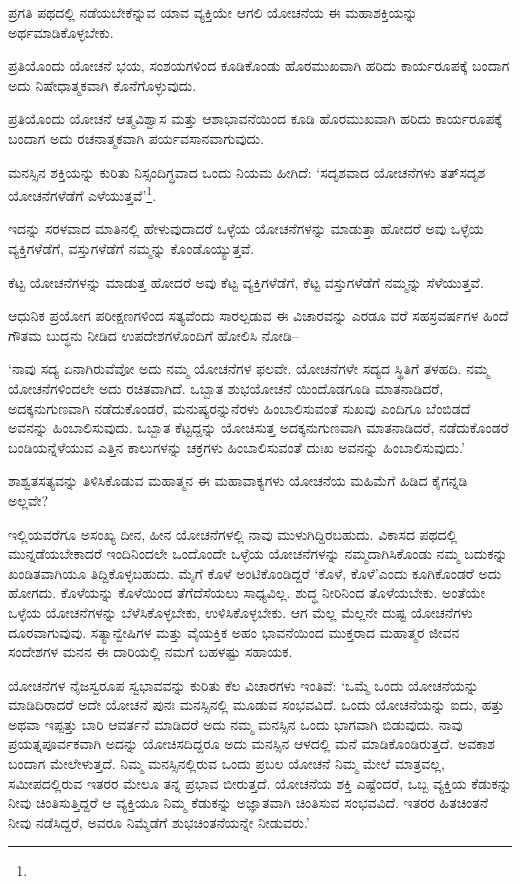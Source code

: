 ಪ್ರಗತಿ ಪಥದಲ್ಲಿ ನಡೆಯಬೇಕೆನ್ನುವ ಯಾವ ವ್ಯಕ್ತಿಯೇ ಆಗಲಿ ಯೋಚನೆಯ ಈ ಮಹಾಶಕ್ತಿಯನ್ನು ಅರ್ಥಮಾಡಿಕೊಳ್ಳಬೇಕು.

ಪ್ರತಿಯೊಂದು ಯೋಚನೆ ಭಯ, ಸಂಶಯಗಳಿಂದ ಕೂಡಿಕೊಂಡು ಹೊರಮುಖವಾಗಿ ಹರಿದು ಕಾರ್ಯರೂಪಕ್ಕೆ ಬಂದಾಗ ಅದು ನಿಷೇಧಾತ್ಮಕವಾಗಿ ಕೊನೆಗೊಳ್ಳುವುದು.

ಪ್ರತಿಯೊಂದು ಯೋಚನೆ ಆತ್ಮವಿಶ್ವಾಸ ಮತ್ತು ಆಶಾಭಾವನೆಯಿಂದ ಕೂಡಿ ಹೊರಮುಖವಾಗಿ ಹರಿದು ಕಾರ್ಯರೂಪಕ್ಕೆ ಬಂದಾಗ ಅದು ರಚನಾತ್ಮಕವಾಗಿ ಪರ್ಯವಸಾನವಾಗುವುದು.

ಮನಸ್ಸಿನ ಶಕ್ತಿಯನ್ನು ಕುರಿತು ನಿಸ್ಸಂದಿಗ್ಧವಾದ ಒಂದು ನಿಯಮ ಹೀಗಿದೆ: ‘ಸದೃಶವಾದ ಯೋಚನೆಗಳು ತತ್​ಸದೃಶ ಯೋಚನೆಗಳೆಡೆಗೆ ಎಳೆಯುತ್ತವೆ’\footnote{}.

ಇದನ್ನು ಸರಳವಾದ ಮಾತಿನಲ್ಲಿ ಹೇಳುವುದಾದರೆ ಒಳ್ಳೆಯ ಯೋಚನೆಗಳನ್ನು ಮಾಡುತ್ತಾ ಹೋದರೆ ಅವು ಒಳ್ಳೆಯ ವ್ಯಕ್ತಿಗಳೆಡೆಗೆ, ವಸ್ತುಗಳೆಡೆಗೆ ನಮ್ಮನ್ನು ಕೊಂಡೊಯ್ಯುತ್ತವೆ.

ಕೆಟ್ಟ ಯೋಚನೆಗಳನ್ನು ಮಾಡುತ್ತ ಹೋದರೆ ಅವು ಕೆಟ್ಟ ವ್ಯಕ್ತಿಗಳೆಡೆಗೆ, ಕೆಟ್ಟ ವಸ್ತುಗಳೆಡೆಗೆ ನಮ್ಮನ್ನು ಸೆಳೆಯುತ್ತವೆ.

ಆಧುನಿಕ ಪ್ರಯೋಗ ಪರೀಕ್ಷಣಗಳಿಂದ ಸತ್ಯವೆಂದು ಸಾರಲ್ಪಡುವ ಈ ವಿಚಾರವನ್ನು ಎರಡೂ ವರೆ ಸಹಸ್ರವರ್ಷಗಳ ಹಿಂದೆ ಗೌತಮ ಬುದ್ಧನು ನೀಡಿದ ಉಪದೇಶಗಳೊಂದಿಗೆ ಹೋಲಿಸಿ ನೋಡಿ–

‘ನಾವು ಸದ್ಯ ಏನಾಗಿರುವೆವೋ ಅದು ನಮ್ಮ ಯೋಚನೆಗಳ ಫಲವೇ. ಯೋಚನೆಗಳೇ ಸದ್ಯದ ಸ್ಥಿತಿಗೆ ತಳಹದಿ. ನಮ್ಮ ಯೋಚನೆಗಳಿಂದಲೇ ಅದು ರಚಿತವಾಗಿದೆ. ಒಬ್ಬಾತ ಶುಭಯೋಚನೆ ಯಿಂದೊಡಗೂಡಿ ಮಾತನಾಡಿದರೆ, ಅದಕ್ಕನುಗುಣವಾಗಿ ನಡೆದುಕೊಂಡರೆ, ಮನುಷ್ಯರನ್ನು\break ನೆರಳು ಹಿಂಬಾಲಿಸುವಂತೆ ಸುಖವು ಎಂದಿಗೂ ಬೆಂಬಿಡದೆ ಅವನನ್ನು ಹಿಂಬಾಲಿಸುವುದು. ಒಬ್ಬಾತ ಕೆಟ್ಟದ್ದನ್ನು ಯೋಚಿಸುತ್ತ ಅದಕ್ಕನುಗುಣವಾಗಿ ಮಾತನಾಡಿದರೆ, ನಡೆದುಕೊಂಡರೆ ಬಂಡಿಯನ್ನೆಳೆ\-ಯುವ ಎತ್ತಿನ ಕಾಲುಗಳನ್ನು ಚಕ್ರಗಳು ಹಿಂಬಾಲಿಸುವಂತೆ ದುಃಖ ಅವನನ್ನು ಹಿಂಬಾಲಿಸುವುದು.’

ಶಾಶ್ವತಸತ್ಯವನ್ನು ತಿಳಿಸಿಕೊಡುವ ಮಹಾತ್ಮನ ಈ ಮಹಾವಾಕ್ಯಗಳು ಯೋಚನೆಯ ಮಹಿಮೆಗೆ ಹಿಡಿದ ಕೈಗನ್ನಡಿ ಅಲ್ಲವೇ?

ಇಲ್ಲಿಯವರೆಗೂ ಅಸಂಖ್ಯ ದೀನ, ಹೀನ ಯೋಚನೆಗಳಲ್ಲಿ ನಾವು ಮುಳುಗಿದ್ದಿರಬಹುದು. ವಿಕಾಸದ ಪಥದಲ್ಲಿ ಮುನ್ನಡೆಯಬೇಕಾದರೆ ಇಂದಿನಿಂದಲೇ ಒಂದೊಂದೇ ಒಳ್ಳೆಯ ಯೋಚನೆಗಳನ್ನು ನಮ್ಮದಾಗಿಸಿಕೊಂಡು ನಮ್ಮ ಬದುಕನ್ನು ಖಂಡಿತವಾಗಿಯೂ ತಿದ್ದಿಕೊಳ್ಳಬಹುದು. ಮೈಗೆ ಕೊಳೆ ಅಂಟಿಕೊಂಡಿದ್ದರೆ ‘ಕೊಳೆ, ಕೊಳೆ’ಎಂದು ಕೂಗಿಕೊಂಡರೆ ಅದು ಹೋಗದು. ಕೊಳೆಯನ್ನು ಕೊಳೆಯಿಂದ ತೆಗೆದೆಸೆಯಲು ಸಾಧ್ಯವಿಲ್ಲ. ಶುದ್ಧ ನೀರಿನಿಂದ ತೊಳೆಯಬೇಕು. ಅಂತೆಯೇ ಒಳ್ಳೆಯ ಯೋಚನೆಗಳನ್ನು ಬೆಳೆಸಿಕೊಳ್ಳಬೇಕು, ಉಳಿಸಿಕೊಳ್ಳಬೇಕು. ಆಗ ಮೆಲ್ಲ ಮೆಲ್ಲನೇ ದುಷ್ಟ ಯೋಚನೆಗಳು ದೂರವಾಗುವುವು. ಸತ್ಯಾನ್ವೇಷಿಗಳ ಮತ್ತು ವೈಯಕ್ತಿಕ ಅಹಂ ಭಾವನೆಯಿಂದ ಮುಕ್ತರಾದ ಮಹಾತ್ಮರ ಜೀವನ ಸಂದೇಶಗಳ ಮನನ ಈ ದಾರಿಯಲ್ಲಿ ನಮಗೆ ಬಹಳಷ್ಟು ಸಹಾಯಕ.

ಯೋಚನೆಗಳ ನೈಜಸ್ವರೂಪ ಸ್ವಭಾವವನ್ನು ಕುರಿತು ಕೆಲ ವಿಚಾರಗಳು ಇಂತಿವೆ: ‘ಒಮ್ಮೆ ಒಂದು ಯೋಚನೆಯನ್ನು ಮಾಡಿದಿರಾದರೆ ಅದೇ ಯೋಚನೆ ಪುನಃ ಮನಸ್ಸಿನಲ್ಲಿ ಮೂಡುವ ಸಂಭವವಿದೆ. ಒಂದು ಯೋಚನೆಯನ್ನು ಐದು, ಹತ್ತು ಅಥವಾ ಇಪ್ಪತ್ತು ಬಾರಿ ಆವರ್ತನೆ ಮಾಡಿದರೆ ಅದು ನಮ್ಮ ಮನಸ್ಸಿನ ಒಂದು ಭಾಗವಾಗಿ ಬಿಡುವುದು. ನಾವು ಪ್ರಯತ್ನಪೂರ್ವಕವಾಗಿ ಅದನ್ನು ಯೋಚಿಸದಿದ್ದರೂ ಅದು ಮನಸ್ಸಿನ ಆಳದಲ್ಲಿ ಮನೆ ಮಾಡಿಕೊಂಡಿರುತ್ತದೆ. ಅವಕಾಶ ಬಂದಾಗ ಮೇಲೇಳುತ್ತದೆ. ನಿಮ್ಮ ಮನಸ್ಸಿನಲ್ಲಿರುವ ಒಂದು ಪ್ರಬಲ ಯೋಚನೆ ನಿಮ್ಮ ಮೇಲೆ ಮಾತ್ರವಲ್ಲ, ಸಮೀಪದಲ್ಲಿರುವ ಇತರರ ಮೇಲೂ ತನ್ನ ಪ್ರಭಾವ ಬೀರುತ್ತದೆ. ಯೋಚನೆಯ ಶಕ್ತಿ ಎಷ್ಟೆಂದರೆ, ಒಬ್ಬ ವ್ಯಕ್ತಿಯ ಕೆಡುಕನ್ನು ನೀವು ಚಿಂತಿಸುತ್ತಿದ್ದರೆ ಆ ವ್ಯಕ್ತಿಯೂ ನಿಮ್ಮ ಕೆಡುಕನ್ನು ಅಜ್ಞಾತವಾಗಿ ಚಿಂತಿಸುವ ಸಂಭವವಿದೆ. ಇತರರ ಹಿತಚಿಂತನೆ ನೀವು ನಡೆಸಿದ್ದರೆ, ಅವರೂ ನಿಮ್ಮೆಡೆಗೆ ಶುಭಚಿಂತನೆಯನ್ನೇ ನೀಡುವರು.’

